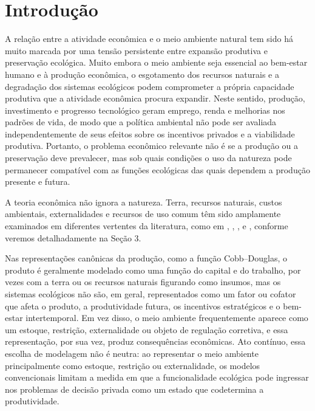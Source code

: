 \section{Introdução}


A relação entre a atividade econômica e o meio ambiente natural tem sido há muito marcada por uma tensão persistente entre expansão produtiva e preservação ecológica. Muito embora o meio ambiente seja essencial ao bem-estar humano e à produção econômica, o esgotamento dos recursos naturais e a degradação dos sistemas ecológicos podem comprometer a própria capacidade produtiva que a atividade econômica procura expandir. Neste sentido, produção, investimento e progresso tecnológico geram emprego, renda e melhorias nos padrões de vida, de modo que a política ambiental não pode ser avaliada independentemente de seus efeitos sobre os incentivos privados e a viabilidade produtiva. Portanto, o problema econômico relevante não é se a produção ou a preservação deve prevalecer, mas sob quais condições o uso da natureza pode permanecer compatível com as funções ecológicas das quais dependem a produção presente e futura.

A teoria econômica não ignora a natureza. Terra, recursos naturais, custos ambientais, externalidades e recursos de uso comum têm sido amplamente examinados em diferentes vertentes da literatura, como em , , ,  e , conforme veremos detalhadamente na Seção 3.

Nas representações canônicas da produção, como a função Cobb–Douglas, o produto é geralmente modelado como uma função do capital e do trabalho, por vezes com a terra ou os recursos naturais figurando como insumos, mas os sistemas ecológicos não são, em geral, representados como um fator ou cofator que afeta o produto, a produtividade futura, os incentivos estratégicos e o bem-estar intertemporal. Em vez disso, o meio ambiente frequentemente aparece como um estoque, restrição, externalidade ou objeto de regulação corretiva, e essa representação, por sua vez, produz consequências econômicas. Ato contínuo, essa escolha de modelagem não é neutra: ao representar o meio ambiente principalmente como estoque, restrição ou externalidade, os modelos convencionais limitam a medida em que a funcionalidade ecológica pode ingressar nos problemas de decisão privada como um estado que codetermina a produtividade.


